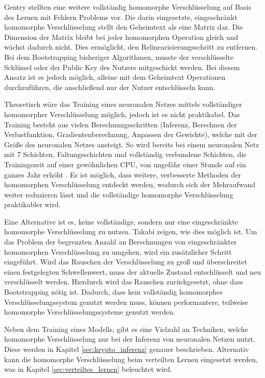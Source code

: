 Gentry \etal \cite{P-102} stellten eine weitere vollständig homomorphe Verschlüsselung auf Basis des Lernen mit Fehlern Problems vor.
Die darin eingesetzte, eingeschränkt homomorphe Verschlüsselung stellt den Geheimtext als eine Matrix dar.
Die Dimension der Matrix bleibt bei jeder homomorphen Operation gleich und wächst dadurch nicht.
Dies ermöglicht, den Relinearisierungsschritt zu entfernen.
Bei dem Bootstrapping bisheriger Algorithmen, musste der verschlüsselte Schlüssel oder der Public Key des Nutzers mitgeschickt werden.
Bei diesem Ansatz ist es jedoch möglich, alleine mit dem Geheimtext Operationen durchzuführen, die anschließend nur der Nutzer entschlüsseln kann.

Theoretisch wäre das Training eines neuronalen Netzes mittels vollständiger homomorpher Verschlüsselung möglich, jedoch ist es nicht praktikabel. 
Das Training besteht aus vielen Berechnungsschritten (Inferenz, Berechnen der Verlustfunktion, Gradientenberechnung, Anpassen der Gewichte), welche mit der Größe des neuronalen Netzes ansteigt.
So wird bereits bei einem neuronalen Netz mit 7 Schichten, Faltungsschichten und vollständig verbundene Schichten, die Trainingszeit auf einer gewöhnlichen CPU, von ungefähr einer Stunde auf ein ganzes Jahr erhöht \cite{P-103}.
Es ist möglich, dass weitere, verbesserte Methoden der homomorphen Verschlüsselung entdeckt werden, wodurch sich der Mehraufwand weiter reduzieren lässt und die vollständige homomorphe Verschlüsselung praktikabler wird.

Eine Alternative ist es, keine vollständige, sondern nur eine eingeschränkte homomorphe Verschlüsselung zu nutzen.
Takabi \etal \cite{P-104} zeigen, wie dies möglich ist.
Um das Problem der begrenzten Anzahl an Berechnungen von eingeschränkter homomorphen Verschlüsselung zu umgehen, wird ein zusätzlicher Schritt eingeführt. 
Wird das Rauschen der Verschlüsselung zu groß und überschreitet einen festgelegten Schwellenwert, muss der aktuelle Zustand entschlüsselt und neu verschlüsselt werden.
Hierdurch wird das Rauschen zurückgesetzt, ohne dass Bootstrapping nötig ist.
Dadurch, dass kein vollständig homomorphes Verschlüsselungssystem genutzt werden muss, können performantere, teilweise homomorphe Verschlüsselungssysteme genutzt werden.

Neben dem Training eines Modells, gibt es eine Vielzahl an Techniken, welche homomorphe Verschlüsselung nur bei der Inferenz von neuronalen Netzen nutzt. 
Diese werden in Kapitel \ref{sec:krypto_inferenz} genauer beschrieben.
Alternativ kann die homomorphe Verschlüsselung beim verteilten Lernen eingesetzt werden, was in Kapitel \ref{sec:verteiltes_lernen} beleuchtet wird. 




